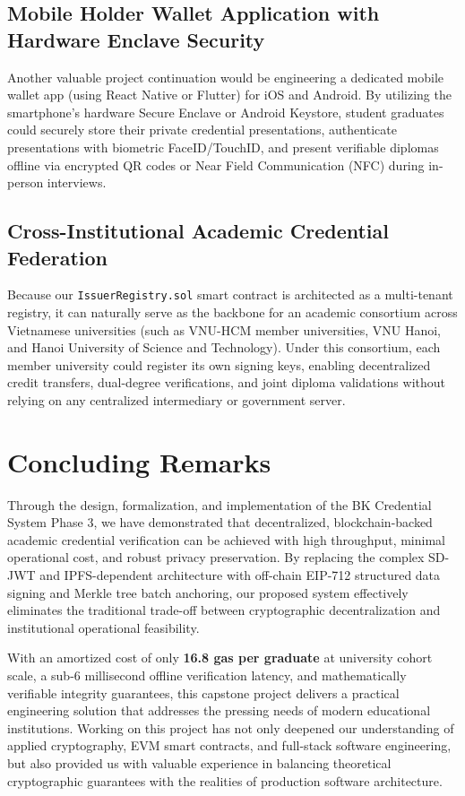 \subsection{Mobile Holder Wallet Application with Hardware Enclave Security}
Another valuable project continuation would be engineering a dedicated mobile wallet app (using React Native or Flutter) for iOS and Android. By utilizing the smartphone's hardware Secure Enclave or Android Keystore, student graduates could securely store their private credential presentations, authenticate presentations with biometric FaceID/TouchID, and present verifiable diplomas offline via encrypted QR codes or Near Field Communication (NFC) during in-person interviews.

\subsection{Cross-Institutional Academic Credential Federation}
Because our \texttt{IssuerRegistry.sol} smart contract is architected as a multi-tenant registry, it can naturally serve as the backbone for an academic consortium across Vietnamese universities (such as VNU-HCM member universities, VNU Hanoi, and Hanoi University of Science and Technology). Under this consortium, each member university could register its own signing keys, enabling decentralized credit transfers, dual-degree verifications, and joint diploma validations without relying on any centralized intermediary or government server.

\section{Concluding Remarks}

Through the design, formalization, and implementation of the BK Credential System Phase 3, we have demonstrated that decentralized, blockchain-backed academic credential verification can be achieved with high throughput, minimal operational cost, and robust privacy preservation. By replacing the complex SD-JWT and IPFS-dependent architecture with off-chain EIP-712 structured data signing and Merkle tree batch anchoring, our proposed system effectively eliminates the traditional trade-off between cryptographic decentralization and institutional operational feasibility.

With an amortized cost of only \textbf{16.8 gas per graduate} at university cohort scale, a sub-6 millisecond offline verification latency, and mathematically verifiable integrity guarantees, this capstone project delivers a practical engineering solution that addresses the pressing needs of modern educational institutions. Working on this project has not only deepened our understanding of applied cryptography, EVM smart contracts, and full-stack software engineering, but also provided us with valuable experience in balancing theoretical cryptographic guarantees with the realities of production software architecture.
